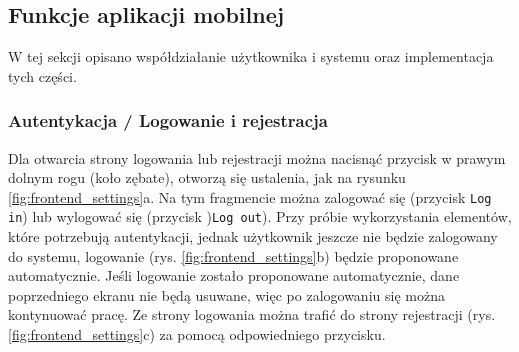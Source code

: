 \subsection{Funkcje aplikacji mobilnej}
W tej sekcji opisano współdziałanie użytkownika i systemu oraz implementacja tych części.

\subsubsection{Autentykacja / Logowanie i rejestracja}
Dla otwarcia strony logowania lub rejestracji można nacisnąć przycisk w prawym dolnym rogu (koło zębate), otworzą się ustalenia, jak na rysunku \ref{fig:frontend_settings}a. Na tym fragmencie można zalogować się (przycisk \texttt{Log in}) lub wylogować się (przycisk )\texttt{Log out}).
Przy próbie wykorzystania elementów, które potrzebują autentykacji, jednak użytkownik jeszcze nie będzie zalogowany do systemu, logowanie (rys. \ref{fig:frontend_settings}b) będzie proponowane automatycznie. Jeśli logowanie zostało proponowane automatycznie, dane poprzedniego ekranu nie będą usuwane, więc po zalogowaniu się można kontynuować pracę.
Ze strony logowania można trafić do strony rejestracji (rys. \ref{fig:frontend_settings}c) za pomocą odpowiedniego przycisku.

